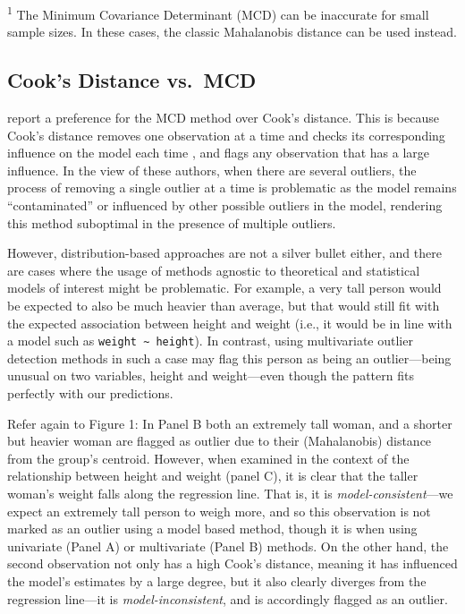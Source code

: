 \documentclass[sn-basic, lineno,pdflatex]{sn-jnl}
\begin{document}
\textsuperscript{1} The Minimum Covariance Determinant (MCD) can be
inaccurate for small sample sizes. In these cases, the classic
Mahalanobis distance can be used instead.

\subsection{Cook's Distance vs.~MCD}\label{cooks-distance-vs.-mcd}

\citet{leys2018outliers} report a preference for the MCD method over
Cook's distance. This is because Cook's distance removes one observation
at a time and checks its corresponding influence on the model each time
\citep{cook1977detection}, and flags any observation that has a large
influence. In the view of these authors, when there are several
outliers, the process of removing a single outlier at a time is
problematic as the model remains ``contaminated'' or influenced by other
possible outliers in the model, rendering this method suboptimal in the
presence of multiple outliers.

However, distribution-based approaches are not a silver bullet either,
and there are cases where the usage of methods agnostic to theoretical
and statistical models of interest might be problematic. For example, a
very tall person would be expected to also be much heavier than average,
but that would still fit with the expected association between height
and weight (i.e., it would be in line with a model such as
\texttt{weight\ \textasciitilde{}\ height}). In contrast, using
multivariate outlier detection methods in such a case may flag this
person as being an outlier---being unusual on two variables, height and
weight---even though the pattern fits perfectly with our predictions.

Refer again to Figure 1: In Panel B both an extremely tall woman, and a
shorter but heavier woman are flagged as outlier due to their
(Mahalanobis) distance from the group's centroid. However, when examined
in the context of the relationship between height and weight (panel C),
it is clear that the taller woman's weight falls along the regression
line. That is, it is \emph{model-consistent}---we expect an extremely
tall person to weigh more, and so this observation is not marked as an
outlier using a model based method, though it is when using univariate
(Panel A) or multivariate (Panel B) methods. On the other hand, the
second observation not only has a high Cook's distance, meaning it has
influenced the model's estimates by a large degree, but it also clearly
diverges from the regression line---it is \emph{model-inconsistent}, and
is accordingly flagged as an outlier.
\end{document}
